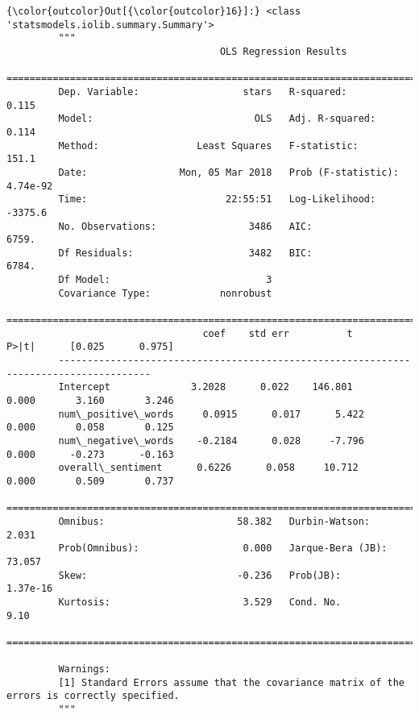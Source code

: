 \documentclass[11pt]{article}
\begin{document}
\begin{Verbatim}[commandchars=\\\{\}]
{\color{outcolor}Out[{\color{outcolor}16}]:} <class 'statsmodels.iolib.summary.Summary'>
         """
                                     OLS Regression Results                            
         ==============================================================================
         Dep. Variable:                  stars   R-squared:                       0.115
         Model:                            OLS   Adj. R-squared:                  0.114
         Method:                 Least Squares   F-statistic:                     151.1
         Date:                Mon, 05 Mar 2018   Prob (F-statistic):           4.74e-92
         Time:                        22:55:51   Log-Likelihood:                -3375.6
         No. Observations:                3486   AIC:                             6759.
         Df Residuals:                    3482   BIC:                             6784.
         Df Model:                           3                                         
         Covariance Type:            nonrobust                                         
         ======================================================================================
                                  coef    std err          t      P>|t|      [0.025      0.975]
         --------------------------------------------------------------------------------------
         Intercept              3.2028      0.022    146.801      0.000       3.160       3.246
         num\_positive\_words     0.0915      0.017      5.422      0.000       0.058       0.125
         num\_negative\_words    -0.2184      0.028     -7.796      0.000      -0.273      -0.163
         overall\_sentiment      0.6226      0.058     10.712      0.000       0.509       0.737
         ==============================================================================
         Omnibus:                       58.382   Durbin-Watson:                   2.031
         Prob(Omnibus):                  0.000   Jarque-Bera (JB):               73.057
         Skew:                          -0.236   Prob(JB):                     1.37e-16
         Kurtosis:                       3.529   Cond. No.                         9.10
         ==============================================================================
         
         Warnings:
         [1] Standard Errors assume that the covariance matrix of the errors is correctly specified.
         """
\end{Verbatim}
            

    
    
    
    
\end{document}
